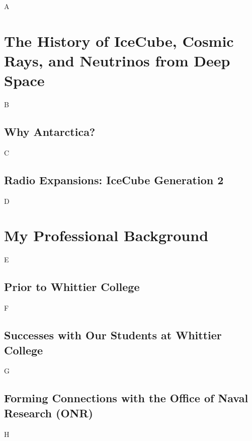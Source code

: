 \documentclass[../../../main.tex]{subfiles}
\begin{document}
A
\section{The History of IceCube, Cosmic Rays, and Neutrinos from Deep Space}
B
\subsection{Why Antarctica?}
C
\subsection{Radio Expansions: IceCube Generation 2}
D
\section{My Professional Background}
E
\subsection{Prior to Whittier College}
F
\subsection{Successes with Our Students at Whittier College}
G
\subsection{Forming Connections with the Office of Naval Research (ONR)}
H
\end{document}

